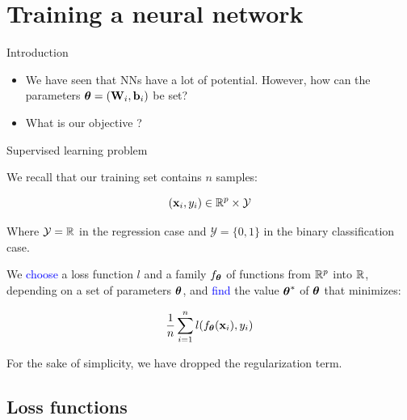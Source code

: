 \documentclass[xcolor=pdftex,dvipsnames,table,mathserif]{beamer}
\begin{document}
\section{Training a neural network}

\begin{frame}{Introduction}

  \begin{itemize}
  \item We have seen that NNs have a lot of potential. However, how can the parameters $\boldsymbol{\theta} = (\mathbf{W}_i, \mathbf{b}_i)$  be set?
  \item What is our objective ?
  \end{itemize}

\end{frame}


\begin{frame}{Supervised learning problem}

  We recall that our training set contains $n$ samples:

  \[
  (\mathbf{x}_i, y_i) \in \mathbb{R}^p \times \mathcal{Y}
  \]

  Where $\mathcal{Y}=\mathbb{R}$ in the regression case and $\mathcal{Y}=\{0, 1\}$ in the binary classification case.

  \pause

  We \textcolor{blue}{choose} a loss function $l$ and a family $f_{\boldsymbol{\theta}}$
  of functions from $\mathbb{R}^p$ into $\mathbb{R}$,
  depending on a set of parameters $\boldsymbol{\theta}$,
  and \textcolor{blue}{find} the value $\boldsymbol{\theta} ^{\ast}$ of $\boldsymbol{\theta}$
  that minimizes:

  \[
  \frac{1}{n} \sum\limits_{i=1}^{n}   l (f_{\boldsymbol{\theta}}(\mathbf{x}_i), y_i)
  \]

  \vspace{1em}

  \pause

  \small{For the sake of simplicity, we have dropped the regularization term.}

\end{frame}


\subsection{Loss functions}
\end{document}
